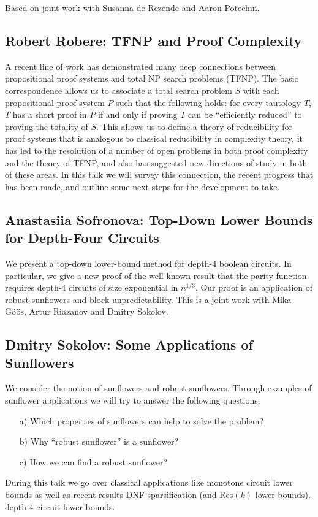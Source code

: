 \documentclass[11pt]{article}
\begin{document}
Based on joint work with Susanna de Rezende and Aaron Potechin.


\subsection*{Robert Robere: TFNP and Proof Complexity}\label{Robere}
A recent line of work has demonstrated many deep connections between propositional proof systems and total NP search problems (TFNP). The basic correspondence allows us to associate a total search problem $S$ with each propositional proof system $P$ such that the following holds: for every tautology $T$, $T$ has a short proof in $P$ if and only if proving $T$ can be “efficiently reduced” to proving the totality of $S$. This allows us to define a theory of reducibility for proof systems that is analogous to classical reducibility in complexity theory, it has led to the resolution of a number of open problems in both proof complexity and the theory of TFNP, and also has suggested new directions of study in both of these areas. In this talk we will survey this connection, the recent progress that has been made, and outline some next steps for the development to take.

\subsection*{Anastasiia Sofronova: Top-Down Lower Bounds for Depth-Four Circuits}\label{Sofronova}

We present a top-down lower-bound method for depth-$4$ boolean circuits. In particular, we give a new proof of the well-known result that the parity function requires depth-$4$ circuits of size exponential in $n^{1/3}$. Our proof is an application of robust sunflowers and block unpredictability.
This is a joint work with Mika Göös, Artur Riazanov and Dmitry Sokolov.


\subsection*{Dmitry Sokolov: Some Applications of Sunflowers}\label{Sokolov}

We consider the notion of sunflowers and robust sunflowers. Through examples
of sunflower applications we will try to answer the following questions:
\begin{enumerate}
  \item[a)] Which properties of sunflowers can help to solve the problem?
  \item[b)] Why ``robust sunflower'' is a sunflower?
  \item[c)] How we can find a robust sunflower?
\end{enumerate}
During this talk we go over classical applications like monotone circuit lower bounds
as well as recent results DNF sparsification (and $\mathrm{Res}(k)$ lower bounds),
depth-$4$ circuit lower bounds.
\end{document}
